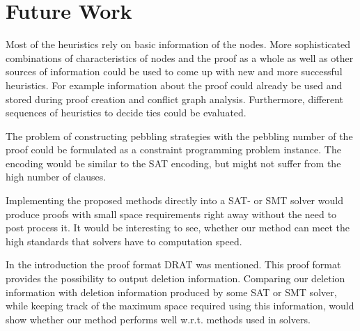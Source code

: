 \section{Future Work}
\label{sec:pebblingfuturework}

Most of the heuristics rely on basic information of the nodes.
More sophisticated combinations of characteristics of nodes and the proof as a whole as well as other sources of information could be used to come up with new and more successful heuristics.
For example information about the proof could already be used and stored during proof creation and conflict graph analysis.
Furthermore, different sequences of heuristics to decide ties could be evaluated.

The problem of constructing pebbling strategies with the pebbling number of the proof could be formulated as a constraint programming problem instance.
The encoding would be similar to the SAT encoding, but might not suffer from the high number of clauses.

Implementing the proposed methods directly into a SAT- or SMT solver would produce proofs with small space requirements right away without the need to post process it.
It would be interesting to see, whether our method can meet the high standards that solvers have to computation speed.

In the introduction the proof format DRAT was mentioned.
This proof format provides the possibility to output deletion information.
Comparing our deletion information with deletion information produced by some SAT or SMT solver, while keeping track of the maximum space required using this information, would show whether our method performs well w.r.t. methods used in solvers.
